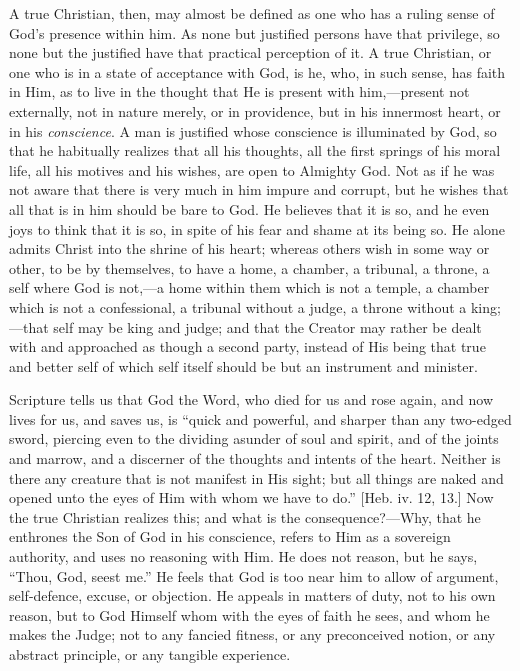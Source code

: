 A true Christian, then, may almost be defined as one who has a
ruling sense of God's presence within him. As none but justified
persons have that privilege, so none but the justified have that
practical perception of it. A true Christian, or one who is in a state
of acceptance with God, is he, who, in such sense, has faith in Him,
as to live in the thought that He is present with him,—present not
externally, not in nature merely, or in providence, but in his
innermost heart, or in his \emph{conscience}. A man is justified whose
conscience is illuminated by God, so that he habitually realizes that
all his thoughts, all the first springs of his moral life, all his
motives and his wishes, are open to Almighty God. Not as if he was not
aware that there is very much in him impure and corrupt, but he wishes
that all that is in him should be bare to God. He believes that it is
so, and he even joys to think that it is so, in spite of his fear and
shame at its being so. He alone admits Christ into the shrine of his
heart; whereas others wish in some way or other, to be by themselves,
to have a home, a chamber, a tribunal, a throne, a self where God is
not,—a home within them which is not a temple, a chamber which is
not a confessional, a tribunal without a judge, a throne without a
king;—that self may be king and judge; and that the Creator may
rather be dealt with and approached as though a second party, instead
of His being that true and better self of which self itself should be
but an instrument and minister.

Scripture tells us that God the Word, who died for us and rose
again, and now lives for us, and saves us, is ``quick and
powerful, and sharper than any two-edged sword, piercing even to the
dividing asunder of soul and spirit, and of the joints and marrow, and
a discerner of the thoughts and intents of the heart. Neither is there
any creature that is not manifest in His sight; but all things are
naked and opened unto the eyes of Him with whom we have to do.''
[Heb. iv. 12, 13.] Now the true Christian realizes this; and what is
the consequence?—Why, that he enthrones the Son of God in his
conscience, refers to Him as a sovereign authority, and uses no
reasoning with Him. He does not reason, but he says, ``Thou, God,
seest me.'' He feels that God is too near him to allow of
argument, self-defence, excuse, or objection. He appeals in matters of
duty, not to his own reason, but to God Himself whom with the eyes of
faith he sees, and whom he makes the Judge; not to any fancied
fitness, or any preconceived notion, or any abstract principle, or any
tangible experience.


